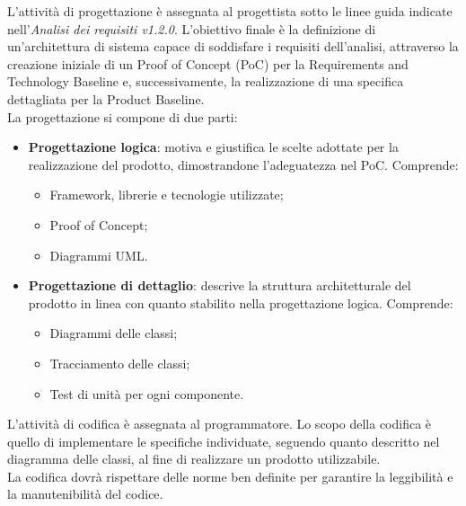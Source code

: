 L'attività di progettazione è assegnata al progettista sotto le linee guida
indicate nell'\textit{Analisi dei requisiti v1.2.0}. L'obiettivo finale è la
definizione di un'architettura di sistema capace di soddisfare i requisiti
dell'analisi, attraverso la creazione iniziale di un Proof of Concept (PoC) per
la Requirements and Technology Baseline e, successivamente, la realizzazione di una
specifica dettagliata per la Product Baseline. \\
La progettazione si compone di due parti:
\begin{itemize}
    \item \textbf{Progettazione logica}: motiva e giustifica le scelte adottate per la realizzazione del prodotto, 
    dimostrandone l'adeguatezza nel PoC. Comprende:
          \begin{itemize}
              \item Framework, librerie e tecnologie utilizzate;
              \item Proof of Concept;
              \item Diagrammi UML.
          \end{itemize}
    \item \textbf{Progettazione di dettaglio}: descrive la struttura architetturale del prodotto in linea con quanto 
    stabilito nella progettazione logica. Comprende:
          \begin{itemize}
              \item Diagrammi delle classi;
              \item Tracciamento delle classi;
              \item Test di unità per ogni componente.
          \end{itemize}
\end{itemize}

L'attività di codifica è assegnata al programmatore. Lo scopo della codifica è quello di 
implementare le specifiche individuate, seguendo quanto descritto nel
diagramma delle classi, al fine di realizzare un prodotto utilizzabile. \\
La codifica dovrà rispettare delle norme ben definite per garantire la leggibilità
e la manutenibilità del codice.\\

